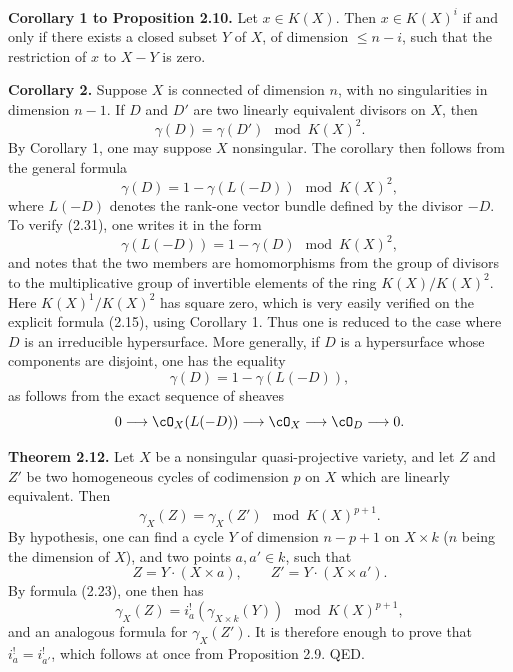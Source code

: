 \textbf{Corollary 1 to Proposition 2.10.} Let $x\in K(X)$. Then $x\in K(X)^i$ if and only if there exists a closed subset $Y$ of $X$, of dimension $\leq n-i$, such that the restriction of $x$ to $X-Y$ is zero.

\textbf{Corollary 2.} Suppose $X$ is connected of dimension $n$, with no singularities in dimension $n-1$. If $D$ and $D'$ are two linearly equivalent divisors on $X$, then
\[
 \gamma(D)=\gamma(D')\mod K(X)^2.
\]
By Corollary 1, one may suppose $X$ nonsingular. The corollary then follows from the general formula
\begin{equation}\tag{2.31}
 \gamma(D)=1-\gamma(L(-D))\mod K(X)^2,
\end{equation}
where $L(-D)$ denotes the rank-one vector bundle defined by the divisor $-D$. To verify (2.31), one writes it in the form
\begin{equation}\tag{2.31 bis}
 \gamma(L(-D))=1-\gamma(D)\mod K(X)^2,
\end{equation}
and notes that the two members are homomorphisms from the group of divisors to the multiplicative group of invertible elements of the ring $K(X)/K(X)^2$. Here $K(X)^1/K(X)^2$ has square zero, which is very easily verified on the explicit formula (2.15), using Corollary 1. Thus one is reduced to the case where $D$ is an irreducible hypersurface. More generally, if $D$ is a hypersurface whose components are disjoint, one has the equality
\begin{equation}\tag{2.32}
 \gamma(D)=1-\gamma(L(-D)),
\end{equation}
as follows from the exact sequence of sheaves
\[
0\longrightarrow \cO_X(L(-D))\longrightarrow \cO_X\longrightarrow \cO_D\longrightarrow 0.
\]

\textbf{Theorem 2.12.} Let $X$ be a nonsingular quasi-projective variety, and let $Z$ and $Z'$ be two homogeneous cycles of codimension $p$ on $X$ which are linearly equivalent. Then
\begin{equation}\tag{2.33}
 \gamma_X(Z)=\gamma_X(Z')\mod K(X)^{p+1}.
\end{equation}
By hypothesis, one can find a cycle $Y$ of dimension $n-p+1$ on $X\times k$ ($n$ being the dimension of $X$), and two points $a,a'\in k$, such that
\[
 Z=Y\cdot (X\times a),\qquad Z'=Y\cdot (X\times a').
\]
By formula (2.23), one then has
\[
 \gamma_X(Z)=i_a^!(\gamma_{X\times k}(Y))\mod K(X)^{p+1},
\]
and an analogous formula for $\gamma_X(Z')$. It is therefore enough to prove that $i_a^!=i_{a'}^!$, which follows at once from Proposition 2.9. QED.

